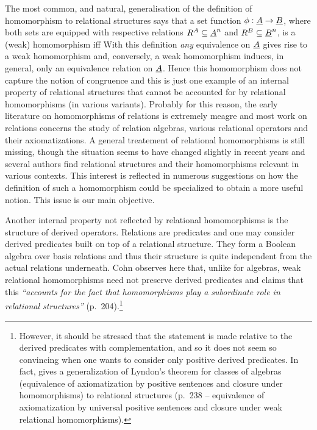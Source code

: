 \documentclass[10pt]{article}
\begin{document}
The most common, and natural, generalisation of the definition of
homomorphism to relational structures says that a set function
$\phi:\underline {A}\rightarrow \underline {B}$, where both sets are equipped with
respective relations $R^A\subseteq \underline {A}^n$ and $R^B\subseteq
\underline {B}^n$, is a (weak) homomorphism 
iff 
With this definition {\em any} equivalence on $\underline {A}$ gives rise
to a weak homomorphism and, conversely, a weak homomorphism induces,
in general, only an equivalence relation on $\underline {A}$.  Hence this
homomorphism does not capture the notion of congruence and this is
just one example of an internal property of relational structures that
cannot be accounted for by relational homomorphisms (in various
variants).  
Probably for this reason, the early literature on
homomorphisms of relations is extremely meagre \cite{Most,c:101} and
most work on relations concerns the study of relation algebras,
various relational operators and their axiomatizations.  A general
treatement of relational homomorphisms is still missing, though the
situation seems to have changed slightly in recent years and
several authors find relational structures and their homomorphisms
relevant in various contexts. This interest is reflected in numerous
suggestions on how the definition of such a homomorphism could be
specialized  to obtain a more useful notion.  This issue is
our main objective.

Another internal property not reflected by relational homomorphisms is
the structure of derived operators. Relations are predicates and one
may consider derived predicates built on top of a relational
structure. They form a Boolean algebra over basis relations and thus
their structure is quite independent from the actual relations
underneath.
%
Cohn \cite{Cohn} observes here that, unlike for algebras, weak
relational homomorphisms need not preserve derived predicates and
claims that this {\em ``accounts for the fact that homomorphisms play
a subordinate role in relational structures''} (p.~204).\footnote{However, it
should be stressed that the statement is made relative to the derived
predicates with complementation, and so it does not seem so convincing
when one wants to consider only positive derived predicates. In fact,
\cite{Cohn} gives a generalization of Lyndon's theorem for classes of
algebras (equivalence of axiomatization by positive sentences and
closure under homomorphisms) to relational structures (p.~238 --
equivalence of axiomatization by universal positive sentences and
closure under weak relational homomorphisms).}
\end{document}
